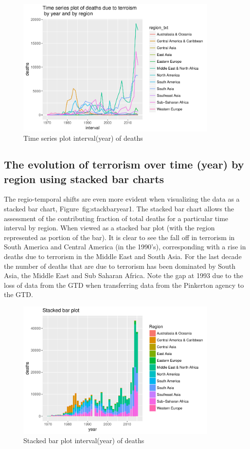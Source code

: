 \begin{figure}[t]
\includegraphics[width=10cm]{Peters_experiment_markdown_files/figure-latex/unnamed-chunk-5-1.pdf}
\caption{Time series plot interval(year) of deaths}
\label{fig:tseriesyear2}
\centering
\end{figure}

\subsection{The evolution of terrorism over time (year) by
region using stacked bar charts}

The regio-temporal shifts are even more evident when visualizing the data as a stacked bar chart, Figure~{fig:stackbaryear1}. The stacked bar chart allows the assessment of the contributing fraction of total deaths for a particular time interval by region. When viewed as a stacked bar plot (with the region represented as portion of the bar). It is clear to see the fall off in terrorism in South America and Central America (in the 1990's), corresponding with a rise in deaths due to terrorism in the Middle East and South Asia. For the last decade the number of deaths that are due to terrorism has been dominated by South Asia, the Middle East and Sub Saharan Africa. Note the gap at 1993 due to the loss of data from the GTD when transferring data from the Pinkerton agency to the GTD.

\begin{figure}[t]
\includegraphics[width=10cm]{Peters_experiment_markdown_files/figure-latex/unnamed-chunk-6-1.pdf}
\caption{Stacked bar plot interval(year) of deaths}
\label{fig:stackbaryear1}
\centering
\end{figure}

